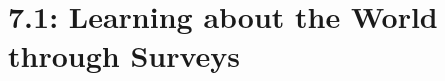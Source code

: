 \documentclass[../mathNotesPreamble]{subfiles}
\begin{document}
  \section{7.1: Learning about the World through Surveys}

  \pagebreak
\end{document}
